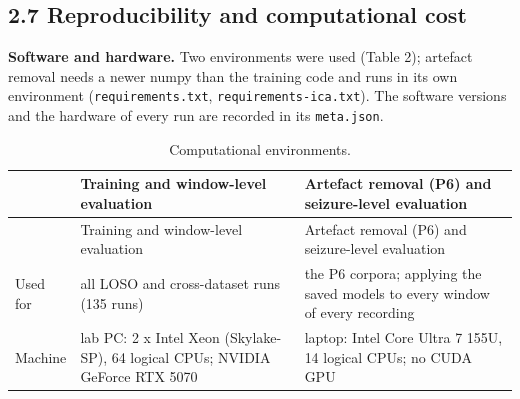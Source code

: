 \documentclass[11pt,a4paper]{article}
\begin{document}
\subsection{2.7 Reproducibility and computational cost}\label{reproducibility-and-computational-cost}

\textbf{Software and hardware.} Two environments were used (Table 2); artefact removal
needs a newer numpy than the training code and runs in its own environment
(\nolinkurl{requirements.txt}, \nolinkurl{requirements-ica.txt}). The software versions and the hardware of
every run are recorded in its \nolinkurl{meta.json}.

\begingroup\small

\begin{longtable}[]{@{}
  >{\raggedright\arraybackslash}p{}
  >{\raggedright\arraybackslash}p{}
  >{\raggedright\arraybackslash}p{}@{}}
\caption{Computational environments.}\tabularnewline
\toprule\noalign{}
\begin{minipage}[b]{\linewidth}\raggedright
\end{minipage} & \begin{minipage}[b]{\linewidth}\raggedright
Training and window-level evaluation
\end{minipage} & \begin{minipage}[b]{\linewidth}\raggedright
Artefact removal (P6) and seizure-level evaluation
\end{minipage} \\
\midrule\noalign{}
\endfirsthead
\toprule\noalign{}
\begin{minipage}[b]{\linewidth}\raggedright
\end{minipage} & \begin{minipage}[b]{\linewidth}\raggedright
Training and window-level evaluation
\end{minipage} & \begin{minipage}[b]{\linewidth}\raggedright
Artefact removal (P6) and seizure-level evaluation
\end{minipage} \\
\midrule\noalign{}
\endhead
\bottomrule\noalign{}
\endlastfoot
Used for & all LOSO and cross-dataset runs (135 runs) & the P6 corpora; applying the saved models to every window of every recording \\
Machine & lab PC: 2 x Intel Xeon (Skylake-SP), 64 logical CPUs; NVIDIA GeForce RTX 5070 & laptop: Intel Core Ultra 7 155U, 14 logical CPUs; no CUDA GPU \\

\end{longtable}
\end{document}
